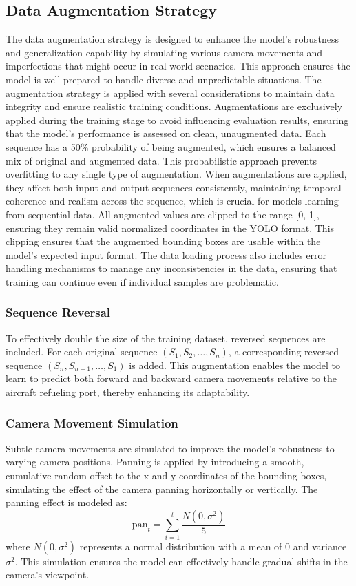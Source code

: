 \documentclass[12pt,oneside]{book} %
\begin{document}
\subsection*{Data Augmentation Strategy}
\noindent The data augmentation strategy is designed to enhance the model's robustness
and generalization capability by simulating various camera movements and
imperfections that might occur in real-world scenarios. This approach ensures
the model is well-prepared to handle diverse and unpredictable situations. The augmentation strategy is applied with several considerations to maintain
data integrity and ensure realistic training conditions. Augmentations are
exclusively applied during the training stage to avoid influencing evaluation
results, ensuring that the model's performance is assessed on clean,
unaugmented data. Each sequence has a 50\% probability of being augmented,
which ensures a balanced mix of original and augmented data. This probabilistic
approach prevents overfitting to any single type of augmentation. When
augmentations are applied, they affect both input and output sequences
consistently, maintaining temporal coherence and realism across the sequence,
which is crucial for models learning from sequential data. All augmented values
are clipped to the range [0, 1], ensuring they remain valid normalized
coordinates in the YOLO format. This clipping ensures that the augmented
bounding boxes are usable within the model's expected input format. The data
loading process also includes error handling mechanisms to manage any
inconsistencies in the data, ensuring that training can continue even if
individual samples are problematic.

\subsubsection*{Sequence Reversal}
\noindent To effectively double the size of the training dataset, reversed sequences are
included. For each original sequence $(S_1, S_2, \ldots, S_n)$, a corresponding
reversed sequence $(S_n, S_{n-1}, \ldots, S_1)$ is added. This augmentation
enables the model to learn to predict both forward and backward camera
movements relative to the aircraft refueling port, thereby enhancing its
adaptability.

\subsubsection*{Camera Movement Simulation}
\noindent Subtle camera movements are simulated to improve the model's robustness to
varying camera positions. Panning is applied by introducing a smooth,
cumulative random offset to the x and y coordinates of the bounding boxes,
simulating the effect of the camera panning horizontally or vertically. The
panning effect is modeled as:
\[
    \text{pan}_t = \sum_{i=1}^t \frac{N(0, \sigma^2)}{5}
\]
where $N(0, \sigma^2)$ represents a normal distribution with a mean of 0 and
variance $\sigma^2$. This simulation ensures the model can effectively handle
gradual shifts in the camera's viewpoint.
\end{document}
